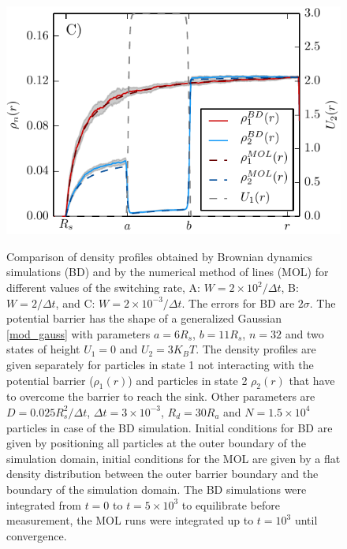 \begin{minipage}[t]{.66 \textwidth}
\begin{figure}[H]
        \vspace{.4 cm} \hspace{-1.2cm } \includegraphics[width = 1 \textwidth]{plots/rd250_numeric.pdf}
    \end{figure}
\end{minipage}\hspace{-0.2 cm}\begin{minipage}[t]{.37 \textwidth}
    \begin{figure}[H]
        \caption{Comparison of density profiles obtained by Brownian dynamics simulations (BD) and by the numerical method of lines (MOL) for different values of the switching rate, A: $W=2 \times 10^{2}/\Delta t$, B: $W=2/\Delta t$, and C: $W=2 \times 10^{-3}/\Delta t$. The errors for BD are $2 \sigma$. The potential barrier has the shape of a generalized Gaussian \eqref{mod_gauss} with parameters $a = 6 R_s$, $b = 11 R_s$, $n = 32$ and two states of height $U_1 = 0$ and $U_2 = 3 K_B T$. The density profiles are given separately for particles in state 1 not interacting with the potential barrier ($\rho_1(r)$) and particles in state 2 $\rho_2(r)$ that have to overcome the barrier to reach the sink. Other parameters are $D = 0.025 R_s^2/\Delta t$, $\Delta t = 3 \times 10^{-3}$, $R_d = 30 R_a$ and $N = 1.5\times 10^{4}$ particles in case of the BD simulation. Initial conditions for BD are given by positioning all particles at the outer boundary of the simulation domain, initial conditions for the MOL  are given by a flat density distribution between the outer barrier boundary and the boundary of the simulation domain. The BD simulations were integrated from $t=0$ to $t=5 \times 10^3$ to equilibrate before measurement, the MOL runs were integrated up to $t = 10^{3}$ until convergence.\label{Rho_numeric}} 
    \end{figure}
\end{minipage}
